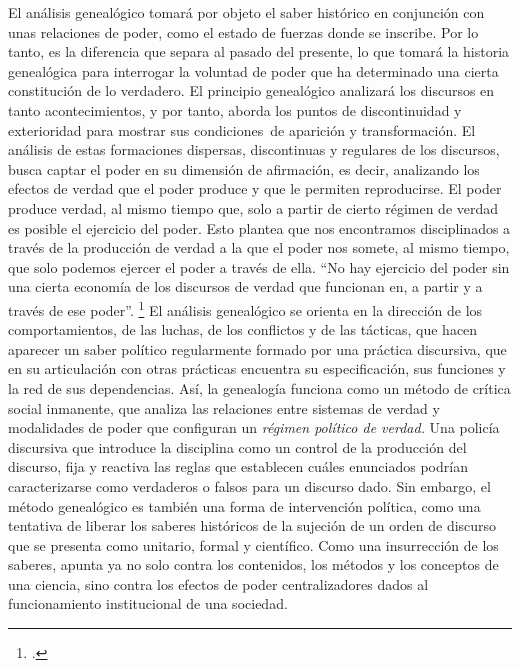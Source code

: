 El análisis genealógico tomará por objeto el saber histórico en conjunción con unas relaciones de poder, como el estado de fuerzas donde se inscribe. Por lo tanto, es la diferencia que separa al pasado del presente, lo que tomará la historia genealógica para interrogar la voluntad de poder que ha determinado una cierta constitución de lo verdadero. El principio genealógico analizará los discursos en tanto acontecimientos, y por tanto, aborda los puntos de discontinuidad y exterioridad para mostrar sus condiciones~de aparición y transformación. El análisis de estas formaciones dispersas, discontinuas y regulares de los discursos, busca captar el poder en su dimensión de afirmación, es decir, analizando los efectos de verdad que el poder produce y que le permiten reproducirse. El poder produce verdad, al mismo tiempo que, solo a partir de cierto régimen de verdad es posible el ejercicio del poder. Esto plantea que nos encontramos disciplinados a través de la producción de verdad a la que el poder nos somete, al mismo tiempo, que solo podemos ejercer el poder a través de ella. \enquote{No hay ejercicio del poder sin una cierta economía de los discursos de verdad que funcionan en, a partir y a través de ese poder}. \footcite[][34]{@7048-FOUCAULT2000} El análisis genealógico se orienta en la dirección de los comportamientos, de las luchas, de los conflictos y de las tácticas, que hacen aparecer un saber político regularmente formado por una práctica discursiva, que en su articulación con otras prácticas encuentra su especificación, sus funciones y la red de sus dependencias. Así, la genealogía funciona como un método de crítica social inmanente, que analiza las relaciones entre sistemas de verdad y modalidades de poder que configuran un \emph{régimen político de verdad.} Una policía discursiva que introduce la disciplina como un control de la producción del discurso, fija y reactiva las reglas que establecen cuáles enunciados podrían caracterizarse como verdaderos o falsos para un discurso dado. Sin embargo, el método genealógico es también una forma de intervención política, como una tentativa de liberar los saberes históricos de la sujeción de un orden de discurso que se presenta como unitario, formal y científico. Como una insurrección de los saberes, apunta ya no solo contra los contenidos, los métodos y los conceptos de una ciencia, sino contra los efectos de poder centralizadores dados al funcionamiento institucional de una sociedad.


